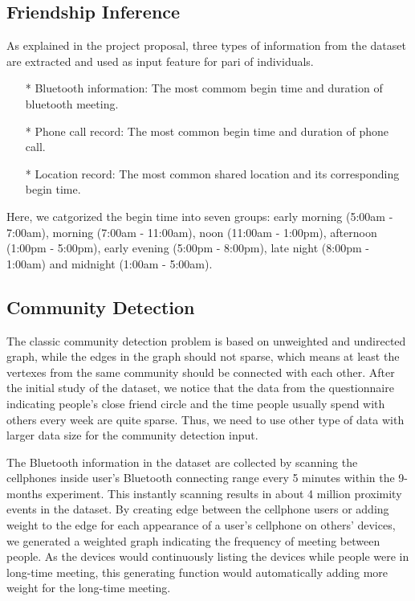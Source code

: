 \documentclass[11pt]{article}
\begin{document}
\subsection{Friendship Inference}
As explained in the project proposal, three types of information from the dataset are extracted and used as input feature for pari of individuals.
\begin{itemize}
\item[*] Bluetooth information: The most commom begin time and duration of bluetooth meeting. 
\item[*] Phone call record: The most common begin time and duration of phone call.
\item[*] Location record: The most common shared location and its corresponding begin time.
\end{itemize}
Here, we catgorized the begin time into seven groups: early morning (5:00am - 7:00am), morning (7:00am - 11:00am), noon (11:00am - 1:00pm), afternoon (1:00pm - 5:00pm), early evening (5:00pm - 8:00pm), late night (8:00pm - 1:00am) and midnight (1:00am - 5:00am).

\subsection{Community Detection}
The classic community detection problem is based on unweighted and undirected graph, while the edges in the graph should not sparse, which means at least the vertexes from the same community should be connected with each other. 
After the initial study of the dataset, we notice that the data from the questionnaire indicating people's close friend circle and the time people usually spend with others every week are quite sparse. Thus, we need to use other type of data with larger data size for the community detection input.

The Bluetooth information in the dataset are collected by scanning the cellphones inside user's Bluetooth connecting range every 5 minutes within the 9-months experiment. This instantly scanning results in about 4 million proximity events in the dataset. By creating edge between the cellphone users or adding weight to the edge for each appearance of a user's cellphone on others' devices, we generated a weighted graph indicating the frequency of meeting between people. As the devices would continuously listing the devices while people were in long-time meeting, this generating function would automatically adding more weight for the long-time meeting.
\end{document}
